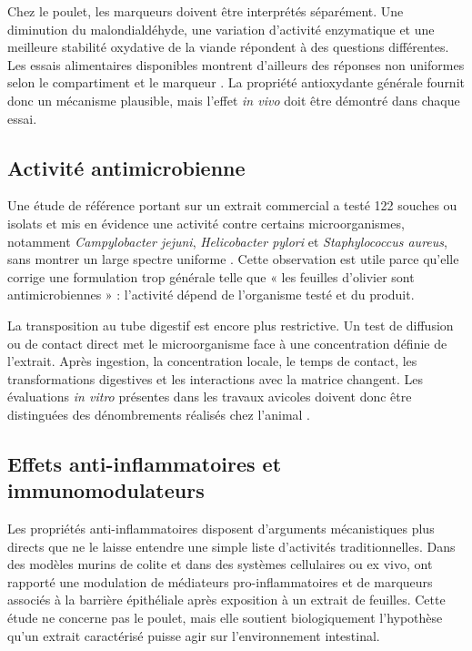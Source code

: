 Chez le poulet, les marqueurs doivent être interprétés séparément. Une diminution du malondialdéhyde, une variation d'activité enzymatique et une meilleure stabilité oxydative de la viande répondent à des questions différentes. Les essais alimentaires disponibles montrent d'ailleurs des réponses non uniformes selon le compartiment et le marqueur \citep{Pirman2021,Vasilopoulou2023,Rezar2025}. La propriété antioxydante générale fournit donc un mécanisme plausible, mais l'effet \textit{in vivo} doit être démontré dans chaque essai.

\subsection{Activité antimicrobienne}

Une étude de référence portant sur un extrait commercial a testé 122 souches ou isolats et mis en évidence une activité contre certains microorganismes, notamment \textit{Campylobacter jejuni}, \textit{Helicobacter pylori} et \textit{Staphylococcus aureus}, sans montrer un large spectre uniforme \citep{Sudjana2009}. Cette observation est utile parce qu'elle corrige une formulation trop générale telle que « les feuilles d'olivier sont antimicrobiennes » : l'activité dépend de l'organisme testé et du produit.

La transposition au tube digestif est encore plus restrictive. Un test de diffusion ou de contact direct met le microorganisme face à une concentration définie de l'extrait. Après ingestion, la concentration locale, le temps de contact, les transformations digestives et les interactions avec la matrice changent. Les évaluations \textit{in vitro} présentes dans les travaux avicoles doivent donc être distinguées des dénombrements réalisés chez l'animal \citep{Almuhayawi2023,Jabri2017}.

\subsection{Effets anti-inflammatoires et immunomodulateurs}

Les propriétés anti-inflammatoires disposent d'arguments mécanistiques plus directs que ne le laisse entendre une simple liste d'activités traditionnelles. Dans des modèles murins de colite et dans des systèmes cellulaires ou ex vivo, \citet{Vezza2017} ont rapporté une modulation de médiateurs pro-inflammatoires et de marqueurs associés à la barrière épithéliale après exposition à un extrait de feuilles. Cette étude ne concerne pas le poulet, mais elle soutient biologiquement l'hypothèse qu'un extrait caractérisé puisse agir sur l'environnement intestinal.

